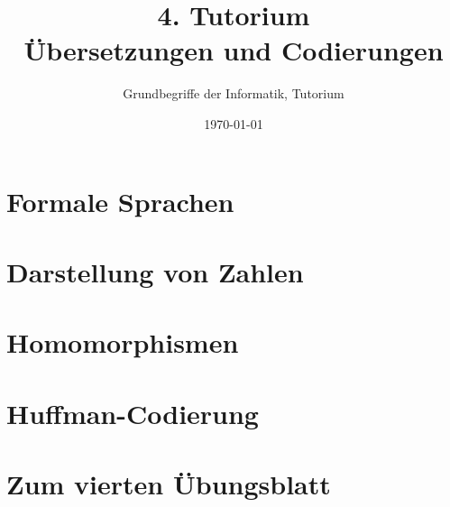 




\title[Übersetzungen und Codierungen]{4. Tutorium\\ Übersetzungen und Codierungen}
\subtitle{Grundbegriffe der Informatik, Tutorium \hashtag\mytutnumber}
\date{\today}


\titleframe
\roadmap

% 


\section{Formale Sprachen}


\section{Darstellung von Zahlen}


\section{Homomorphismen}


\section{Huffman-Codierung}


\section{Zum vierten Übungsblatt}


